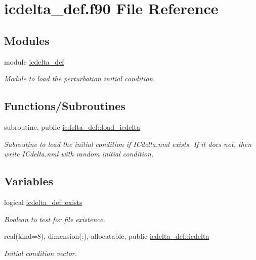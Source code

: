 \hypertarget{icdelta__def_8f90}{}\section{icdelta\+\_\+def.\+f90 File Reference}
\label{icdelta__def_8f90}
\subsection*{Modules}
\begin{DoxyCompactItemize}
\item 
module \hyperlink{namespaceicdelta__def}{icdelta\+\_\+def}
\begin{DoxyCompactList}\small\item\em Module to load the perturbation initial condition. \end{DoxyCompactList}\end{DoxyCompactItemize}
\subsection*{Functions/\+Subroutines}
\begin{DoxyCompactItemize}
\item 
subroutine, public \hyperlink{namespaceicdelta__def_a7be926b74337687f36be5d971a4e02a2}{icdelta\+\_\+def\+::load\+\_\+icdelta}
\begin{DoxyCompactList}\small\item\em Subroutine to load the initial condition if I\+Cdelta.\+nml exists. If it does not, then write I\+Cdelta.\+nml with random initial condition. \end{DoxyCompactList}\end{DoxyCompactItemize}
\subsection*{Variables}
\begin{DoxyCompactItemize}
\item 
logical \hyperlink{namespaceicdelta__def_a3d6fe1a548a46a14b09fd3313b9e3546}{icdelta\+\_\+def\+::exists}
\begin{DoxyCompactList}\small\item\em Boolean to test for file existence. \end{DoxyCompactList}\item 
real(kind=8), dimension(\+:), allocatable, public \hyperlink{namespaceicdelta__def_a1ced9e0fa24222e5dc2f79996864b7da}{icdelta\+\_\+def\+::icdelta}
\begin{DoxyCompactList}\small\item\em Initial condition vector. \end{DoxyCompactList}\end{DoxyCompactItemize}
